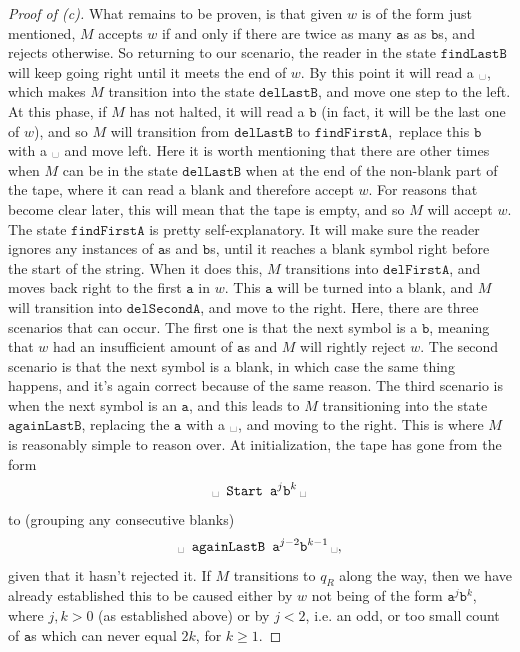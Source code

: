\documentclass[11pt,a4paper]{article}
\newcommand{\bl}{\ensuremath{\text{\textvisiblespace}}}
\begin{document}
\begin{proof}[Proof of (c)]
What remains to be proven, is that given $w$ is of the form just mentioned, $M$ accepts $w$ if and only if there are twice as many $\texttt{a}$s as $\texttt{b}$s, and rejects otherwise.
 So returning to our scenario, the reader in the state $\texttt{findLastB}$
will keep going right until it meets the end of $w$. By this point it will read
a $\bl$, which makes $M$ transition into the state $\texttt{delLastB}$, and
move one step to the left. At this phase, if $M$ has not halted, it will read a $\texttt{b}$ (in fact, it will be the last one of $w$), and so $M$ will
transition from $\texttt{delLastB}$ to $\texttt{findFirstA},$ replace this
$\texttt{b}$ with a $\bl$ and move left. Here it is worth mentioning that there are other times when $M$ can be in the state $\texttt{delLastB}$ when at the end of the non-blank part of the tape, where it can read a blank and therefore accept $w$. For reasons that become clear later, this will mean that the tape is empty, and so $M$ will accept $w$.
 The state $\texttt{findFirstA}$ is pretty self-explanatory. It will make sure the reader ignores any instances of $\texttt{a}$s and $\texttt{b}$s, until it
reaches a blank symbol right before the start of the string. When it does this,
$M$ transitions into $\texttt{delFirstA}$, and moves back right to the first
$\texttt{a}$ in $w$. This $\texttt{a}$ will be turned into a blank, and $M$
will transition into $\texttt{delSecondA}$, and move to the right. Here, there
are three scenarios that can occur.  The first one is that the next symbol is a
$\texttt{b}$, meaning that $w$ had an insufficient amount of $\texttt{a}$s and $M$ will rightly reject $w$. The second scenario is that the next symbol is a blank,
in which case the same thing happens, and it's again correct because of the same reason.
 The third scenario is when the next symbol is an $\texttt{a}$, and this leads
to $M$ transitioning into the state  $\texttt{againLastB}$, replacing the
$\texttt{a}$ with a $\bl$, and moving to the right. This is where $M$ is
reasonably simple to reason over.
At initialization, the tape has gone from the form \[
\bl \texttt{ Start a}^{j} \texttt{b}^{k} \, \bl
\] to (grouping any consecutive blanks) \[
\bl \texttt{ againLastB a}^{j - 2} \texttt{b}^{k - 1} \, \bl,
\] given that it hasn't rejected it. If $M$ transitions to $q_{R}$ along the
way, then we have already established this to be caused either by $w$ not being of the
form  $\texttt{a}^{j}\texttt{b}^{k}$, where $j,k > 0$ (as established above) or by $j<2$, i.e. an odd, or too small count of $\texttt{a}$s which can never equal $2k$, for $k\geq 1$.


\end{proof}
\end{document}
